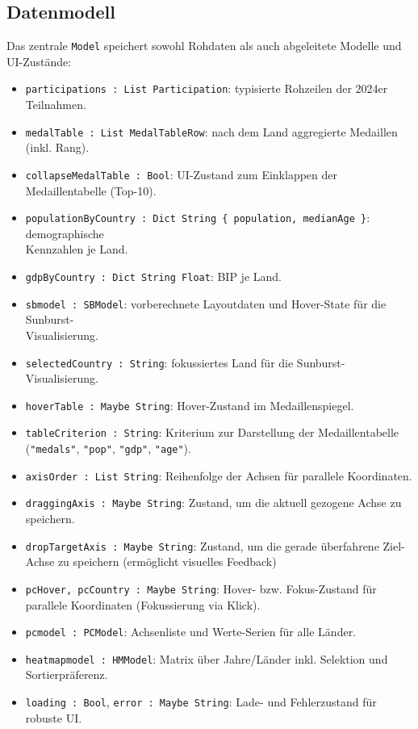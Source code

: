 \subsection{Datenmodell}
Das zentrale \texttt{Model} speichert sowohl Rohdaten als auch abgeleitete Modelle und UI-Zustände:
	\begin{itemize}
	\item \texttt{participations : List Participation}: typisierte Rohzeilen der 2024er Teilnahmen.
	\item \texttt{medalTable : List MedalTableRow}: nach dem Land aggregierte Medaillen (inkl. Rang).
	\item \texttt{collapseMedalTable : Bool}: UI-Zustand zum Einklappen der Medaillentabelle (Top-10).
	\item \texttt{populationByCountry : Dict String \{ population, medianAge \}}: demographische\\ Kennzahlen je Land.
	\item \texttt{gdpByCountry : Dict String Float}: BIP je Land.
	\item \texttt{sbmodel : SBModel}: vorberechnete Layoutdaten und Hover-State für die Sunburst-\\Visualisierung.
	\item \texttt{selectedCountry : String}: fokussiertes Land für die Sunburst-Visualisierung.
	\item \texttt{hoverTable : Maybe String}: Hover-Zustand im Medaillenspiegel.
	\item \texttt{tableCriterion : String}: Kriterium zur Darstellung der Medaillentabelle (\texttt{"medals"}, \texttt{"pop"}, \texttt{"gdp"}, \texttt{"age"}).
	\item \texttt{axisOrder : List String}: Reihenfolge der Achsen für parallele Koordinaten.
	\item \texttt{draggingAxis : Maybe String}: Zustand, um die aktuell gezogene Achse zu speichern.
    \item \texttt{dropTargetAxis : Maybe String}: Zustand, um die gerade überfahrene Ziel-Achse zu speichern (ermöglicht visuelles Feedback)
	\item \texttt{pcHover, pcCountry : Maybe String}: Hover- bzw. Fokus-Zustand für parallele Koordinaten (Fokussierung via Klick).
	\item \texttt{pcmodel : PCModel}: Achsenliste und Werte-Serien für alle Länder.
	\item \texttt{heatmapmodel : HMModel}: Matrix über Jahre/Länder inkl. Selektion und Sortierpräferenz.
	\item \texttt{loading : Bool}, \texttt{error : Maybe String}: Lade- und Fehlerzustand für robuste UI.
\end{itemize}


